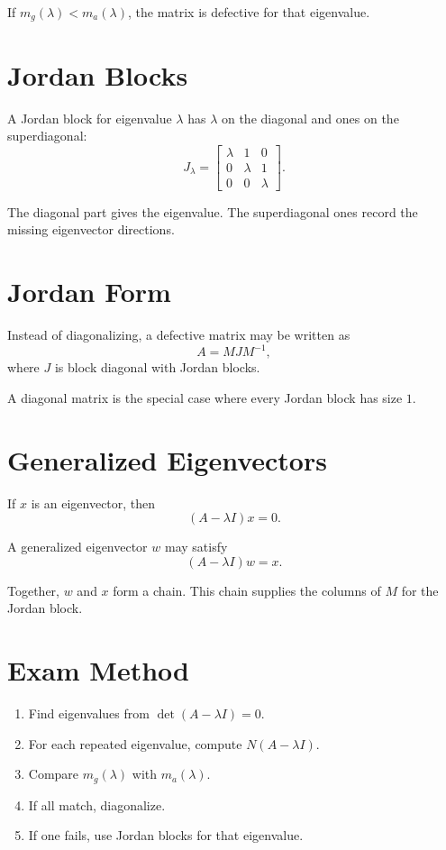 \documentclass[10pt]{article}
\begin{document}
If \(m_g(\lambda)<m_a(\lambda)\), the matrix is defective for that eigenvalue.

\section{Jordan Blocks}

A Jordan block for eigenvalue \(\lambda\) has \(\lambda\) on the diagonal and ones on the superdiagonal:
\[
J_{\lambda}=
\begin{bmatrix}
\lambda & 1 & 0\\
0 & \lambda & 1\\
0 & 0 & \lambda
\end{bmatrix}.
\]

The diagonal part gives the eigenvalue. The superdiagonal ones record the missing eigenvector directions.

\section{Jordan Form}

Instead of diagonalizing, a defective matrix may be written as
\[
A=MJM^{-1},
\]
where \(J\) is block diagonal with Jordan blocks.

A diagonal matrix is the special case where every Jordan block has size \(1\).

\section{Generalized Eigenvectors}

If \(x\) is an eigenvector, then
\[
(A-\lambda I)x=0.
\]

A generalized eigenvector \(w\) may satisfy
\[
(A-\lambda I)w=x.
\]

Together, \(w\) and \(x\) form a chain. This chain supplies the columns of \(M\) for the Jordan block.

\section{Exam Method}

\begin{enumerate}
  \item Find eigenvalues from \(\det(A-\lambda I)=0\).
  \item For each repeated eigenvalue, compute \(N(A-\lambda I)\).
  \item Compare \(m_g(\lambda)\) with \(m_a(\lambda)\).
  \item If all match, diagonalize.
  \item If one fails, use Jordan blocks for that eigenvalue.
\end{enumerate}
\end{document}
